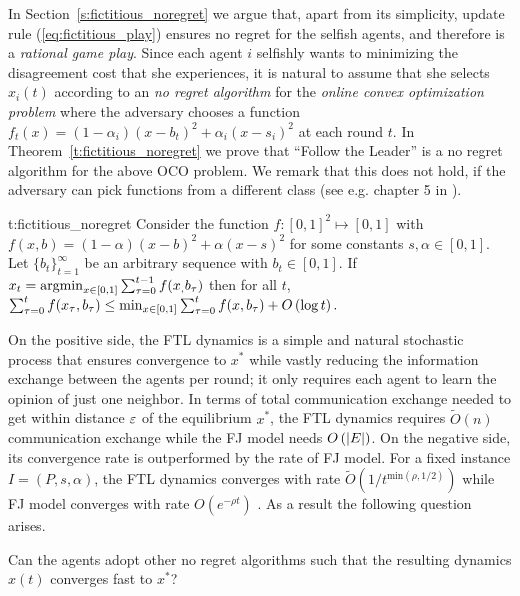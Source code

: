 In Section~\ref{s:fictitious_noregret} we argue that,
apart from its simplicity, update rule (\ref{eq:fictitious_play}) ensures
no regret for the selfish agents, and therefore is a \emph{rational game play}.
Since each agent $i$ selfishly wants to minimizing the disagreement cost
that she experiences, it is natural to assume that she selects $x_i(t)$ according to
an \emph{no regret algorithm} for the \emph{online convex optimization problem}
where the adversary chooses a function $f_t(x)=(1-\alpha_i)(x-b_t)^2 + \alpha_i(x-s_i)^2$
at each round $t$. In Theorem~\ref{t:fictitious_noregret}
we prove that \enquote{Follow the Leader} is a no regret algorithm
for the above OCO problem. We remark that this does not hold,
if the adversary can pick functions from a different class
(see e.g. chapter 5 in \cite{Haz16}).

\begin{reptheorem}{t:fictitious_noregret}
  Consider the function $f:[0,1]^2 \mapsto [0,1]$ with
  $f(x,b) = (1-\alpha)(x-b)^2 + \alpha(x-s)^2$ for some
  constants $s,\alpha \in [0,1]$.
  Let $\{b_t\}_{t=1}^\infty$ be an arbitrary sequence with
  $b_t \in [0,1]$. If $x_t = \operatorname*{argmin}_{x \in [0,1]}\sum_{\tau=0}^{t-1}f(x_,b_\tau)$
  then for all $t$,
  \(
    \sum_{\tau=0}^{t}f(x_\tau,b_\tau) \leq
    \min_{x \in [0,1]}\sum_{\tau=0}^tf(x,b_\tau) + O\left(\log t\right).
  \)
\end{reptheorem}

On the positive side, the FTL dynamics is a simple and natural
stochastic process that ensures convergence to $x^*$ while
vastly reducing the information exchange between the agents
per round; it only requires each agent to learn the opinion
of just one neighbor. In terms of total communication exchange
needed to get within distance $\varepsilon$ of the equilibrium $x^*$,
the FTL dynamics requires $\widetilde{O}(n)$ communication
exchange while the FJ model needs $O\left(|E|\right)$.
On the negative side, its convergence rate
is outperformed by the rate of FJ model.
For a fixed instance $I=(P,s,\alpha)$, the
FTL dynamics converges with rate
$\widetilde{O}(1/t^{\text{min}(\rho,1/2)})$ while FJ model
converges with rate $O(e^{-\rho t})$ \cite{GS14}.
As a result the following question arises.
\begin{question}
  Can the agents adopt other no regret algorithms such that the resulting
  dynamics $x(t)$ converges fast to $x^*$?
\end{question}

